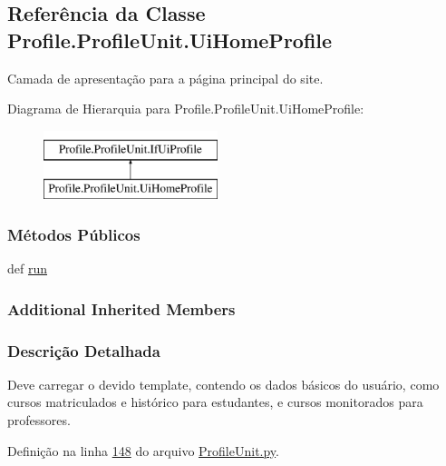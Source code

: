 \hypertarget{classProfile_1_1ProfileUnit_1_1UiHomeProfile}{\subsection{Referência da Classe Profile.\-Profile\-Unit.\-Ui\-Home\-Profile}
\label{classProfile_1_1ProfileUnit_1_1UiHomeProfile}
}


Camada de apresentação para a página principal do site.  


Diagrama de Hierarquia para Profile.\-Profile\-Unit.\-Ui\-Home\-Profile\-:\begin{figure}[H]
\begin{center}
\leavevmode
\includegraphics[height=2.000000cm]{db/dcf/classProfile_1_1ProfileUnit_1_1UiHomeProfile}
\end{center}
\end{figure}
\subsubsection*{Métodos Públicos}
\begin{DoxyCompactItemize}
\item 
def \hyperlink{classProfile_1_1ProfileUnit_1_1UiHomeProfile_a5abc7f7c1ca1cb3e070c36a869263e6d}{run}
\end{DoxyCompactItemize}
\subsubsection*{Additional Inherited Members}


\subsubsection{Descrição Detalhada}
Deve carregar o devido template, contendo os dados básicos do usuário, como cursos matriculados e histórico para estudantes, e cursos monitorados para professores. 

Definição na linha \hyperlink{ProfileUnit_8py_source_l00148}{148} do arquivo \hyperlink{ProfileUnit_8py_source}{Profile\-Unit.\-py}.



